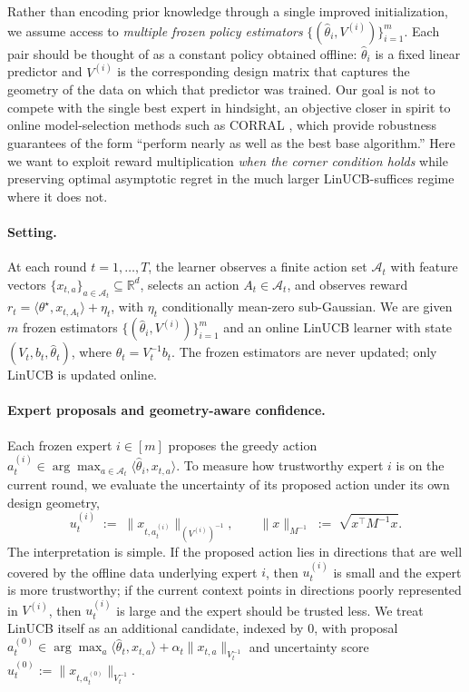 \documentclass{article}
\theoremstyle{definition}
\theoremstyle{remark}
\theoremstyle{remark}
\begin{document}
Rather than encoding prior knowledge through a single improved
initialization, we assume access to \emph{multiple frozen policy
estimators} $\{(\widehat\theta_i,V^{(i)})\}_{i=1}^m$. Each pair should
be thought of as a constant policy obtained offline:
$\widehat\theta_i$ is a fixed linear predictor and $V^{(i)}$ is the
corresponding design matrix that captures the geometry of the data on
which that predictor was trained. Our goal is not to compete with the
single best expert in hindsight, an objective closer in spirit to
online model-selection methods such as CORRAL
\cite{agarwal2017corralling,chen2024llmdecision}, which provide
robustness guarantees of the form ``perform nearly as well as the best
base algorithm.'' Here we want to exploit reward multiplication
\emph{when the corner condition holds} while preserving optimal
asymptotic regret in the much larger LinUCB-suffices regime where it
does not.

\paragraph{Setting.}
At each round $t=1,\dots,T$, the learner observes a finite action set
$\mathcal A_t$ with feature vectors
$\{x_{t,a}\}_{a\in\mathcal A_t}\subseteq\mathbb R^d$, selects an action
$A_t\in\mathcal A_t$, and observes reward
$r_t = \langle\theta^\star,x_{t,A_t}\rangle + \eta_t$,
with $\eta_t$ conditionally mean-zero sub-Gaussian.
We are given $m$ frozen estimators
$\{(\widehat\theta_i,V^{(i)})\}_{i=1}^m$ and an online LinUCB learner
with state $(V_t,b_t,\widehat\theta_t)$, where
$\widehat\theta_t = V_t^{-1}b_t$. The frozen estimators are never
updated; only LinUCB is updated online.

\paragraph{Expert proposals and geometry-aware confidence.}
Each frozen expert $i\in[m]$ proposes the greedy action
$a_t^{(i)}\in\arg\max_{a\in\mathcal A_t}\langle\widehat\theta_i,x_{t,a}\rangle$.
To measure how trustworthy expert $i$ is on the current round, we
evaluate the uncertainty of its proposed action under its own design
geometry,
\[
u_t^{(i)} \;:=\; \bigl\|x_{t,a_t^{(i)}}\bigr\|_{(V^{(i)})^{-1}},
\qquad
\|x\|_{M^{-1}} \;:=\; \sqrt{x^\top M^{-1}x}.
\]
The interpretation is simple. If the proposed action lies in directions
that are well covered by the offline data underlying expert $i$, then
$u_t^{(i)}$ is small and the expert is more trustworthy; if the current
context points in directions poorly represented in $V^{(i)}$, then
$u_t^{(i)}$ is large and the expert should be trusted less. We treat
LinUCB itself as an additional candidate, indexed by $0$, with proposal
$a_t^{(0)}\in\arg\max_a\langle\widehat\theta_t,x_{t,a}\rangle+\alpha_t\|x_{t,a}\|_{V_t^{-1}}$
and uncertainty score $u_t^{(0)} := \|x_{t,a_t^{(0)}}\|_{V_t^{-1}}$.
\end{document}
